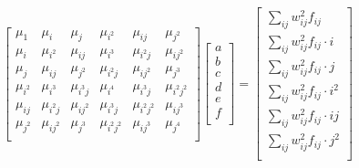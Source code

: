 \documentclass[aps,11pt]{revtex4}
\begin{document}
\begin{equation}
\displaystyle
	\begin{bmatrix}
		\mu_1     & \mu_{i} & \mu_{j} & \mu_{i^2} & \mu_{ij} & \mu_{j^2}\\
		\mu_i     & \mu_{i^2} & \mu_{ij} & \mu_{i^3} & \mu_{i^2j} & \mu_{ij^2}\\
		\mu_j     & \mu_{ij} & \mu_{j^2} & \mu_{i^2j} & \mu_{ij^2} & \mu_{j^3}\\
		\mu_{i^2} & \mu_{i^3} & \mu_{i^3j} & \mu_{i^4} & \mu_{i^3j} & \mu_{i^2j^2}\\
		\mu_{ij}  & \mu_{i^2j} & \mu_{ij^2} & \mu_{i^3j} & \mu_{i^2j^2} & \mu_{ij^3}\\
		\mu_{j^2} & \mu_{ij^2} & \mu_{j^3} & \mu_{i^2j^2} & \mu_{ij^3} & \mu_{j^4}\\
	\end{bmatrix}
	\begin{bmatrix}
	a\\
	b\\
	c\\
	d\\
	e\\
	f\\
	\end{bmatrix}
	=
\begin{bmatrix}
	\sum_{ij} w_{ij}^2 f_{ij}        \\
	\sum_{ij} w_{ij}^2 f_{ij} \cdot i\\
	\sum_{ij} w_{ij}^2 f_{ij} \cdot j\\
	\sum_{ij} w_{ij}^2 f_{ij} \cdot i^2\\
	\sum_{ij} w_{ij}^2 f_{ij} \cdot ij\\
	\sum_{ij} w_{ij}^2 f_{ij} \cdot j^2\\
\end{bmatrix}
\end{equation}
\end{document}
